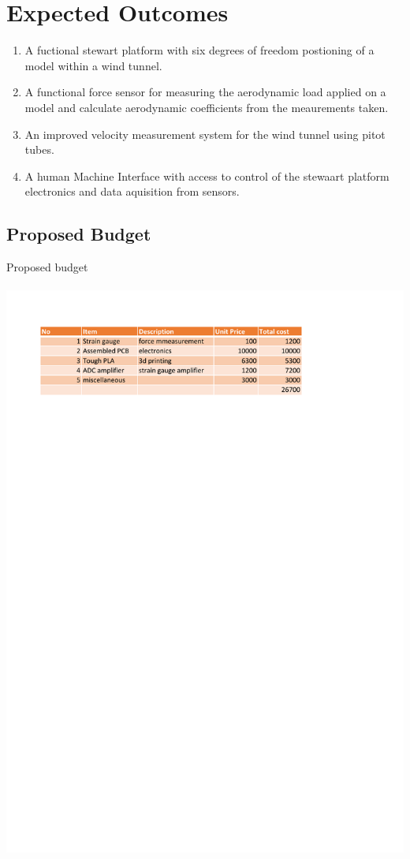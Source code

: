 \section{Expected Outcomes}
\begin{enumerate}
\item A fuctional stewart platform with six degrees of freedom postioning of a model within a wind tunnel.
\item A functional force sensor for measuring the aerodynamic load applied on a model and calculate aerodynamic coefficients from the meaurements taken.
\item An improved velocity measurement system for the wind tunnel using pitot tubes.
\item A human Machine Interface with access to control  of the stewaart platform electronics and data aquisition from sensors.
\end{enumerate}
\newpage
\subsection{Proposed Budget}
\begin{center}
\begin{table}[!h]
\centering
\caption{Proposed budget}
\paragraph{ }
\includegraphics{Figures/budget}
\end{table}
\end{center}
